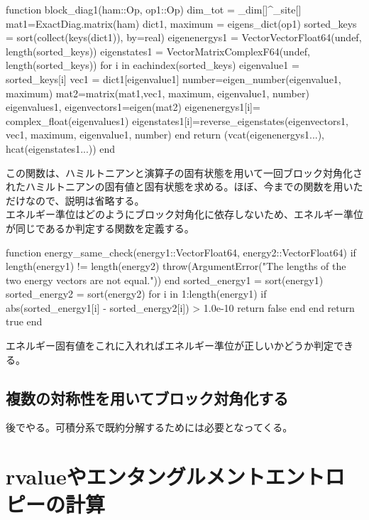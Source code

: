 \documentclass{ltjsarticle}
\begin{document}
\begin{jllisting}
function block_diag1(ham::Op, op1::Op)
  dim_tot = _dim[]^_site[]
  mat1=ExactDiag.matrix(ham)
  dict1, maximum = eigens_dict(op1)
  sorted_keys = sort(collect(keys(dict1)), by=real)
  eigenenergys1 = Vector{Vector{Float64}}(undef, length(sorted_keys))
  eigenstates1 = Vector{Matrix{ComplexF64}}(undef, length(sorted_keys))
  for i in eachindex(sorted_keys)
    eigenvalue1 = sorted_keys[i]
    vec1 = dict1[eigenvalue1]
    number=eigen_number(eigenvalue1, maximum)
    mat2=matrix(mat1,vec1, maximum, eigenvalue1, number)
    eigenvalues1, eigenvectors1=eigen(mat2)
    eigenenergys1[i]= complex_float(eigenvalues1)
    eigenstates1[i]=reverse_eigenstates(eigenvectors1, vec1, maximum, eigenvalue1, number)
  end
  return (vcat(eigenenergys1...), hcat(eigenstates1...))
end
\end{jllisting}
この関数は、ハミルトニアンと演算子の固有状態を用いて一回ブロック対角化されたハミルトニアンの固有値と固有状態を求める。ほぼ、今までの関数を用いただけなので、説明は省略する。\\
エネルギー準位はどのようにブロック対角化に依存しないため、エネルギー準位が同じであるか判定する関数を定義する。
\begin{jllisting}
function energy_same_check(energy1::Vector{Float64}, energy2::Vector{Float64})
  if length(energy1) != length(energy2)
    throw(ArgumentError("The lengths of the two energy vectors are not equal."))
  end
  sorted_energy1 = sort(energy1)
  sorted_energy2 = sort(energy2)
  for i in 1:length(energy1)
    if abs(sorted_energy1[i] - sorted_energy2[i]) > 1.0e-10
      return false
    end
  end
  return true
end
\end{jllisting}
エネルギー固有値をこれに入れればエネルギー準位が正しいかどうか判定できる。\\
\subsection{複数の対称性を用いてブロック対角化する}
後でやる。可積分系で既約分解するためには必要となってくる。
\section{rvalueやエンタングルメントエントロピーの計算}
\end{document}
